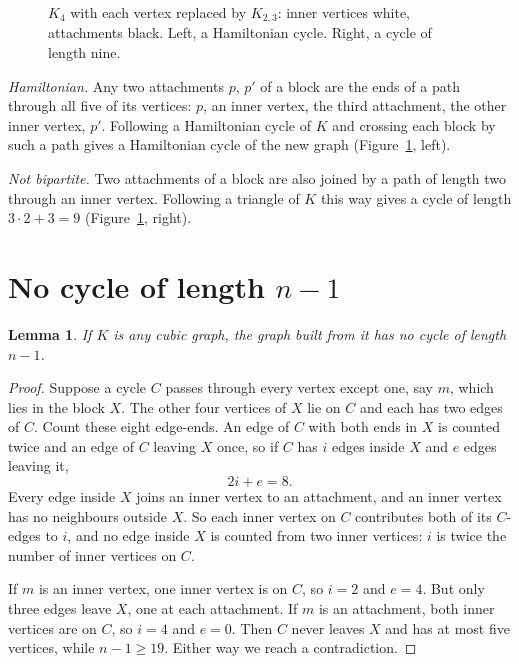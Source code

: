\documentclass[11pt]{amsart}
\newtheorem{lemma}[theorem]{Lemma}
\theoremstyle{remark}
\begin{document}
\begin{figure}[ht]
\centering
\qquad\qquad

\caption{$K_4$ with each vertex replaced by $K_{2,3}$: inner vertices white, attachments black.
Left, a Hamiltonian cycle. Right, a cycle of length nine.}\label{fig:graph}
\end{figure}

\emph{Hamiltonian.} Any two attachments $p$, $p'$ of a block are the ends of a path through all five
of its vertices: $p$, an inner vertex, the third attachment, the other inner vertex, $p'$. Following a
Hamiltonian cycle of $K$ and crossing each block by such a path gives a Hamiltonian cycle of the new
graph (Figure~\ref{fig:graph}, left).

\emph{Not bipartite.} Two attachments of a block are also joined by a path of length two through an
inner vertex. Following a triangle of $K$ this way gives a cycle of length $3\cdot2+3=9$
(Figure~\ref{fig:graph}, right).

\section{No cycle of length \texorpdfstring{$n-1$}{n-1}}

\begin{lemma}\label{lem:count}
If $K$ is any cubic graph, the graph built from it has no cycle of length $n-1$.
\end{lemma}

\begin{proof}
Suppose a cycle $C$ passes through every vertex except one, say $m$, which lies in the block $X$.
The other four vertices of $X$ lie on $C$ and each has two edges of $C$. Count these eight edge-ends.
An edge of $C$ with both ends in $X$ is counted twice and an edge of $C$ leaving $X$ once, so if $C$
has $i$ edges inside $X$ and $e$ edges leaving it,
\[
2i+e=8.
\]
Every edge inside $X$ joins an inner vertex to an attachment, and an inner vertex has no neighbours
outside $X$. So each inner vertex on $C$ contributes both of its $C$-edges to $i$, and no edge inside
$X$ is counted from two inner vertices: $i$ is twice the number of inner vertices on $C$.

If $m$ is an inner vertex, one inner vertex is on $C$, so $i=2$ and $e=4$. But only three edges leave
$X$, one at each attachment. If $m$ is an attachment, both inner vertices are on $C$, so $i=4$ and
$e=0$. Then $C$ never leaves $X$ and has at most five vertices, while $n-1\ge 19$. Either way we reach
a contradiction.
\end{proof}
\end{document}
